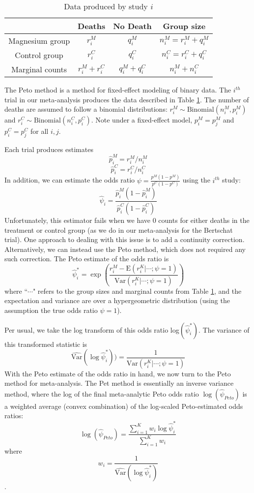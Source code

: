 \documentclass[fleqn,10pt]{SelfArx} %
\begin{document}
\bgroup
\def\arraystretch{1.2}
\begin{table}
\caption{Data produced by study $i$} \label{tab:sld}
\begin{center}
\begin{tabular}{| c | c | c | c |}
\hline
	& Deaths & No Death & Group size \\
\hline
Magnesium group &  $r_i^M$ & $q_i^M$ & $n_i^M = r_i^M + q_i^M$\\
\hline
Control group &  $r_i^C$ & $q_i^C$ & $n_i^C = r_i^C + q_i^C$  \\
\hline
Marginal counts & $r_i^M + r_i^C$ & $q_i^M + q_i^C$ & $n_i^M + n_i^C$ \\
\hline
\end{tabular}
\end{center}
\end{table}
\egroup

The Peto method is a method for fixed-effect modeling of binary data. The $i^{th}$ trial in our meta-analysis produces the data described in Table \ref{tab:sld}. The number of deaths are assumed to follow a binomial distributions: $r_i^M \sim \textrm{Binomial}(n_i^M, p_i^M)$ and $r_i^C \sim \textrm{Binomial}(n_i^C, p_i^C)$. Note under a fixed-effect model, $p_i^M = p_j^M$ and $p_i^C = p_j^C$ for all $i, j$.

Each trial produces estimates
\[\hat{p}_i^M = r_i^M/n_i^M\]
\[\hat{p}_i^C = r_i^C / n_i^C\]
In addition, we can estimate the odds ratio $\psi = \frac{p^M (1- p^M)}{p^C (1 - p^C)}$ using the $i^{th}$ study:
\[\hat{\psi}_i = \frac{\hat{p}_i^M(1-\hat{p}_i^M)}{\hat{p}_i^C(1-\hat{p}_i^C)}\]
Unfortunately, this estimator fails when we have 0 counts for either deaths in the treatment or control group (as we do in our meta-analysis for the Bertschat trial). One approach to dealing with this issue is to add a continuity correction. Alternatively, we can instead use the Peto method, which does not required any such correction. The Peto estimate of the odds ratio is
\[\hat{\psi}_i^* = \exp\left(\frac{r_i^M - \textrm{E}(r_i^K | \cdots; \psi = 1)}{\textrm{Var}(r_i^K | \cdots; \psi = 1)}\right)\]
where ``$\cdots$" refers to the group sizes and marginal counts from Table \ref{tab:sld}, and the expectation and variance are over a hypergeometric distribution (using the assumption the true odds ratio $\psi = 1$).

Per usual, we take the log transform of this odds ratio log$(\hat{\psi}_i^*)$. The variance of this transformed statistic is
\[\widehat{\textrm{Var}}(\log \hat{\psi}_i^*)) = \frac{1}{\textrm{Var}(r_i^K | \cdots; \psi = 1)}\]
With the Peto estimate of the odds ratio in hand, we now turn to the Peto method for meta-analysis. The Pet method is essentially an inverse variance method, where the log of the final meta-analytic Peto odds ratio $\log(\hat{\psi}_{Peto})$ is a weighted average (convex combination) of the log-scaled Peto-estimated odds ratios:
\[\log(\hat{\psi}_{Peto}) = \frac{\sum_{i = 1}^K w_i \log \hat{\psi}_i^*}{\sum_{i = 1}^K w_i} \]
where
\[w_i = \frac{1}{\widehat{\textrm{Var}}(\log \hat{\psi}_i^*)}\].
\end{document}
